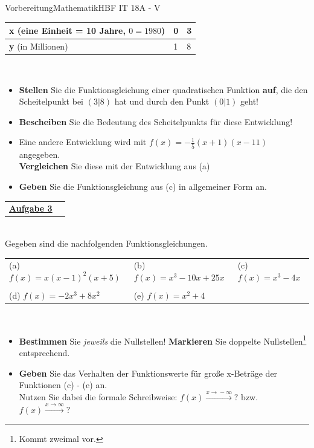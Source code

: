 \documentclass[oneside,openany,headings=optiontotoc,11pt,numbers=noenddot]{scrreprt}
\begin{document}
\begin{test}{Vorbereitung}{Mathematik}{HBF IT 18A - V}
		\par\noindent
		\renewcommand{\arraystretch}{1}
		\begin{tabularx}{\textwidth}{|X|X|X|}
			\hline
			\textbf{x} (eine Einheit = 10 Jahre, \(0 = 1980\)) & 0 & 3\\
			\hline
			\textbf{y} (in Millionen) & 1 & 8\\
			\hline
		\end{tabularx}\\
		\par\noindent
		\begin{itemize}
			\item[(a)] \textbf{Stellen} Sie die Funktionsgleichung einer quadratischen Funktion \textbf{auf}, die den Scheitelpunkt bei \((3|8)\) hat und durch den Punkt \((0|1)\) geht!			
			\item[(b)] \textbf{Bescheiben} Sie die Bedeutung des Scheitelpunkts für diese Entwicklung!
			\item[(c)] Eine andere Entwicklung wird mit \(f(x) = -\frac{1}{5}(x+1)(x-11)\) angegeben.\\
			\textbf{Vergleichen} Sie diese mit der Entwicklung aus (a)
			\item[(d)] \textbf{Geben} Sie die Funktionsgleichung aus (c) in allgemeiner Form an.
		\end{itemize}
	\end{test}
	\noindent
	\begin{tabularx}{\textwidth}{Xl}\underline{\textbf{Aufgabe 3}}&\end{tabularx}\\
	Gegeben sind die nachfolgenden Funktionsgleichungen.\\
	\begin{tabularx}{\textwidth}{XXX}
		(a) \(f(x) = x(x-1)^2(x+5)\) & (b) \( f(x) = x^3 - 10x + 25x\) & (c) \(f(x) = x^3 -4x\)\\
		\\
		(d) \(f(x) = -2x^3 +8x^2\) & (e) \(f(x) = x^2 + 4\)
	\end{tabularx}\\
	\par\noindent
	\begin{itemize}
		\item[(1)] \textbf{Bestimmen} Sie \textit{jeweils} die Nullstellen! \textbf{Markieren} Sie doppelte Nullstellen\footnote{Kommt zweimal vor.} entsprechend.
		\item[(2)] \textbf{Geben} Sie das Verhalten der Funktionswerte für große x-Beträge der Funktionen (c) - (e) an.\\
		\small{Nutzen Sie dabei die formale Schreibweise: \(f(x)\xrightarrow{x\rightarrow{}-\infty}?\) bzw. \(f(x)\xrightarrow{x\rightarrow{}\infty}?\)}\normalsize
	\end{itemize}
\end{document}
